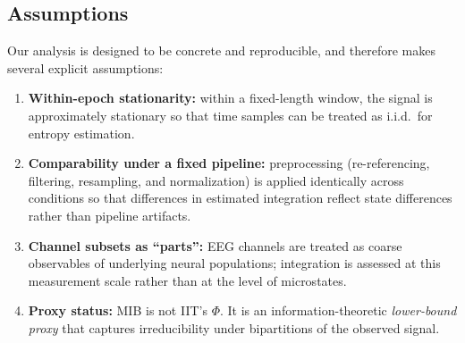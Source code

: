 \documentclass[11pt]{article}
\begin{document}
\subsection{Assumptions}
Our analysis is designed to be concrete and reproducible, and therefore makes several explicit assumptions:
\begin{enumerate}[leftmargin=*]
    \item \textbf{Within-epoch stationarity:} within a fixed-length window, the signal is approximately stationary so that time samples can be treated as i.i.d.\ for entropy estimation.
    \item \textbf{Comparability under a fixed pipeline:} preprocessing (re-referencing, filtering, resampling, and normalization) is applied identically across conditions so that differences in estimated integration reflect state differences rather than pipeline artifacts.
    \item \textbf{Channel subsets as ``parts'':} EEG channels are treated as coarse observables of underlying neural populations; integration is assessed at this measurement scale rather than at the level of microstates.
    \item \textbf{Proxy status:} MIB is not IIT's $\Phi$. It is an information-theoretic \emph{lower-bound proxy} that captures irreducibility under bipartitions of the observed signal.
\end{enumerate}
\end{document}
